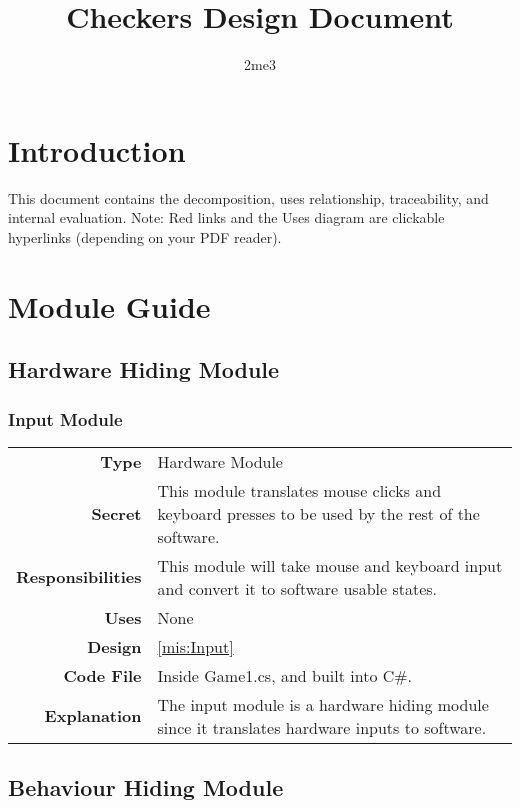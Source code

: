 \documentclass[10pt]{article}
\title{\bf Checkers Design Document}
\author{2me3}
\date{}
\makeatletter
\newcommand{\CustomLabel}[1]{\Hy@raisedlink{\hypertarget{#1}{}}\label{#1}}
\makeatother
\begin{document}
\maketitle

\tableofcontents

\section{Introduction}
    This document contains the decomposition, uses relationship, traceability, and internal evaluation.
    Note: Red links and the Uses diagram are clickable hyperlinks (depending on your PDF reader).
    
\section{Module Guide}

\subsection{Hardware Hiding Module}
    
    \subsubsection{Input Module}\CustomLabel{mod:Input}
    \begin{tabularx}{\linewidth}{ >{\bfseries}r X }
        Type            & Hardware Module \\
        Secret          & This module translates mouse clicks and keyboard presses to be used by the rest of the software. \\
        Responsibilities & This module will take mouse and keyboard input and convert it to software usable states. \\
        Uses            & None \\
        Design          & \ref{mis:Input} \\
        Code File       & Inside Game1.cs, and built into C\#. \\
        Explanation     & The input module is a hardware hiding module since it translates hardware inputs to software. \\
    \end{tabularx}

\subsection{Behaviour Hiding Module}
\end{document}
